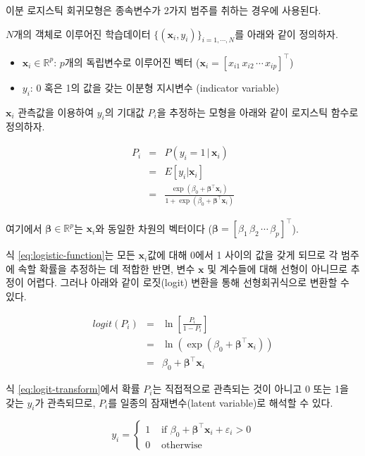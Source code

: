 \documentclass[]{book}
\providecommand{\tightlist}{%
  \setlength{\itemsep}{0pt}\setlength{\parskip}{0pt}}
\begin{document}
이분 로지스틱 회귀모형은 종속변수가 2가지 범주를 취하는 경우에 사용된다.

\(N\)개의 객체로 이루어진 학습데이터 \(\{(\mathbf{x}_i, y_i)\}_{i = 1, \cdots, N}\)를 아래와 같이 정의하자.

\begin{itemize}
\tightlist
\item
  \(\mathbf{x}_i \in \mathbb{R}^p\): \(p\)개의 독립변수로 이루어진 벡터 (\(\mathbf{x}_i = [x_{i1} \, x_{i2} \, \cdots \, x_{ip}]^\top\))
\item
  \(y_i\): 0 혹은 1의 값을 갖는 이분형 지시변수 (indicator variable)
\end{itemize}

\(\mathbf{x}_i\) 관측값을 이용하여 \(y_i\)의 기대값 \(P_i\)을 추정하는 모형을 아래와 같이 로지스틱 함수로 정의하자.

\begin{eqnarray}
P_i &=& P(y_i = 1 \,|\, \mathbf{x}_i)\\
&=& E[y_i | \mathbf{x}_i]\\ 
&=& \frac{\exp(\beta_0 + \boldsymbol\beta^\top \mathbf{x}_i)}{1 + \exp(\beta_0 + \boldsymbol\beta^\top \mathbf{x}_i)}
\label{eq:logistic-function}
\end{eqnarray}

여기에서 \(\boldsymbol\beta \in \mathbb{R}^{p}\)는 \(\mathbf{x}_i\)와 동일한 차원의 벡터이다 (\(\boldsymbol\beta = [\beta_1 \, \beta_2 \, \cdots \, \beta_p]^\top\)).

식 \eqref{eq:logistic-function}는 모든 \(\mathbf{x}_i\)값에 대해 0에서 1 사이의 값을 갖게 되므로 각 범주에 속할 확률을 추정하는 데 적합한 반면, 변수 \(\mathbf{x}\) 및 계수들에 대해 선형이 아니므로 추정이 어렵다. 그러나 아래와 같이 로짓(logit) 변환을 통해 선형회귀식으로 변환할 수 있다.

\begin{eqnarray}
logit(P_i) &=& \ln \left[ \frac{P_i}{1 - P_i} \right]\\
&=& \ln(\exp(\beta_0 + \boldsymbol\beta^\top \mathbf{x}_i))\\
&=& \beta_0 + \boldsymbol\beta^\top \mathbf{x}_i
\label{eq:logit-transform}
\end{eqnarray}

식 \eqref{eq:logit-transform}에서 확률 \(P_i\)는 직접적으로 관측되는 것이 아니고 0 또는 1을 갖는 \(y_i\)가 관측되므로, \(P_i\)를 일종의 잠재변수(latent variable)로 해석할 수 있다.

\begin{equation}
y_i = \begin{cases}
1 & \text{ if } \beta_0 + \boldsymbol\beta^\top \mathbf{x}_i + \varepsilon_i > 0 \\
0 & \text{ otherwise }
\end{cases}
\label{eq:binary-logistic-latent-interpret}
\end{equation}
\end{document}
